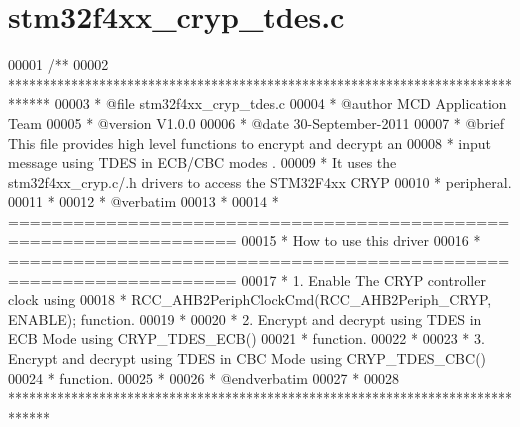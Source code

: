 \section{stm32f4xx\+\_\+cryp\+\_\+tdes.\+c}
\label{stm32f4xx__cryp__tdes_8c_source}

\begin{DoxyCode}
00001 \textcolor{comment}{/**}
00002 \textcolor{comment}{  ******************************************************************************}
00003 \textcolor{comment}{  * @file    stm32f4xx\_cryp\_tdes.c}
00004 \textcolor{comment}{  * @author  MCD Application Team}
00005 \textcolor{comment}{  * @version V1.0.0}
00006 \textcolor{comment}{  * @date    30-September-2011}
00007 \textcolor{comment}{  * @brief   This file provides high level functions to encrypt and decrypt an }
00008 \textcolor{comment}{  *          input message using TDES in ECB/CBC modes .}
00009 \textcolor{comment}{  *          It uses the stm32f4xx\_cryp.c/.h drivers to access the STM32F4xx CRYP}
00010 \textcolor{comment}{  *          peripheral.}
00011 \textcolor{comment}{  *}
00012 \textcolor{comment}{  *  @verbatim}
00013 \textcolor{comment}{  *}
00014 \textcolor{comment}{  *          ===================================================================}
00015 \textcolor{comment}{  *                                   How to use this driver}
00016 \textcolor{comment}{  *          ===================================================================}
00017 \textcolor{comment}{  *          1. Enable The CRYP controller clock using }
00018 \textcolor{comment}{  *            RCC\_AHB2PeriphClockCmd(RCC\_AHB2Periph\_CRYP, ENABLE); function.}
00019 \textcolor{comment}{  *}
00020 \textcolor{comment}{  *          2. Encrypt and decrypt using TDES in ECB Mode using CRYP\_TDES\_ECB()}
00021 \textcolor{comment}{  *             function.}
00022 \textcolor{comment}{  *}
00023 \textcolor{comment}{  *          3. Encrypt and decrypt using TDES in CBC Mode using CRYP\_TDES\_CBC()}
00024 \textcolor{comment}{  *             function.}
00025 \textcolor{comment}{  *}
00026 \textcolor{comment}{  *  @endverbatim}
00027 \textcolor{comment}{  *}
00028 \textcolor{comment}{  ******************************************************************************}

\end{DoxyCode}
